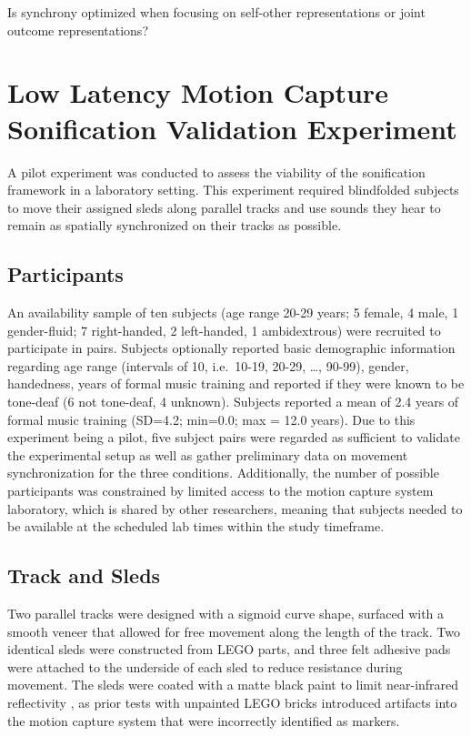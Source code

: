 \documentclass[10pt,a4paper,onecolumn]{article}
\begin{document}
Is synchrony optimized when focusing on self-other representations or joint outcome representations?

\hypertarget{low-latency-motion-capture-sonification-validation-experiment}{%
\section{Low Latency Motion Capture Sonification Validation Experiment}\label{low-latency-motion-capture-sonification-validation-experiment}}

A pilot experiment was conducted to assess the viability of the sonification framework in a laboratory setting. This experiment required blindfolded subjects to move their assigned sleds along parallel tracks and use sounds they hear to remain as spatially synchronized on their tracks as possible.

\hypertarget{participants}{%
\subsection{Participants}\label{participants}}

An availability sample of ten subjects (age range 20-29 years; 5 female, 4 male, 1 gender-fluid; 7 right-handed, 2 left-handed, 1 ambidextrous) were recruited to participate in pairs. Subjects optionally reported basic demographic information regarding age range (intervals of 10, i.e.~10-19, 20-29, \ldots, 90-99), gender, handedness, years of formal music training and reported if they were known to be tone-deaf (6 not tone-deaf, 4 unknown). Subjects reported a mean of 2.4 years of formal music training (SD=4.2; min=0.0; max = 12.0 years). Due to this experiment being a pilot, five subject pairs were regarded as sufficient to validate the experimental setup as well as gather preliminary data on movement synchronization for the three conditions. Additionally, the number of possible participants was constrained by limited access to the motion capture system laboratory, which is shared by other researchers, meaning that subjects needed to be available at the scheduled lab times within the study timeframe.

\hypertarget{track-and-sleds}{%
\subsection{Track and Sleds}\label{track-and-sleds}}

Two parallel tracks were designed with a sigmoid curve shape, surfaced with a smooth veneer that allowed for free movement along the length of the track. Two identical sleds were constructed from LEGO parts, and three felt adhesive pads were attached to the underside of each sled to reduce resistance during movement. The sleds were coated with a matte black paint to limit near-infrared reflectivity \autocite{benedictSurveyMaterialsCoatings2016}, as prior tests with unpainted LEGO bricks introduced artifacts into the motion capture system that were incorrectly identified as markers.
\end{document}
